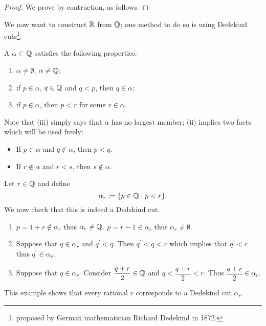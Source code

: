 \begin{proof}
We prove by contruction, as follows. 
\end{proof}

We now want to construct $\mathbb R$ from $\mathbb Q$; one method to do so is using Dedekind cuts\footnote{proposed by German mathematician Richard Dedekind in 1872.}.

\begin{definition}
A  $\alpha\subset\mathbb Q$ satisfies the following properties:
\begin{enumerate}[label=(\roman*)]
\item $\alpha\neq\emptyset$, $\alpha\neq\mathbb Q$;
\item if $p\in\alpha$, $q\in\mathbb Q$ and $q<p$, then $q\in\alpha$;
\item if $p\in\alpha$, then $p<r$ for some $r\in\alpha$.
\end{enumerate}
\end{definition}

\begin{remark}
Note that (iii) simply says that $\alpha$ has no largest member; (ii) implies two facts which will be used freely:
\begin{itemize}
\item If $p\in\alpha$ and $q\notin\alpha$, then $p<q$.
\item If $r\notin\alpha$ and $r<s$, then $s\notin\alpha$.
\end{itemize}
\end{remark}

\begin{example}
Let $r\in\mathbb Q$ and define
\[ \alpha_r\coloneqq\{p\in\mathbb Q\mid p<r\}. \]
We now check that this is indeed a Dedekind cut.
\begin{enumerate}[label=(\roman*)]
\item $p=1+r\notin\alpha_r$ thus $\alpha_r\neq\mathbb Q$. $p=r-1\in\alpha_r$ thus $\alpha_r\neq\emptyset$.

\item Suppose that $q\in\alpha_r$ and $q^\prime<q$. Then $q^\prime<q<r$ which implies that $q^\prime<r$ thus $q^\prime\in\alpha_r$.

\item Suppose that $q\in\alpha_r$. Consider $\dfrac{q+r}{2}\in\mathbb Q$ and $q<\dfrac{q+r}{2}<r$. Thus $\dfrac{q+r}{2}\in\alpha_r$.
\end{enumerate}
\end{example}

This example shows that every rational $r$ corresponds to a Dedekind cut $\alpha_r$.

